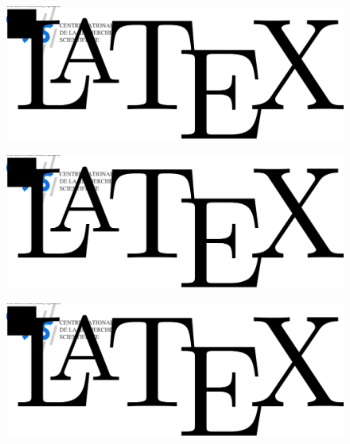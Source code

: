 \documentclass[10pt,a4paper]{article}
\begin{document}
\begin{figure}
\includegraphics[subfig=2,scale=0.5]{fig/logo.svg}
\end{figure}
\begin{figure}
\includegraphics[subfig=1,scale=0.5]{fig/logo.svg}
\end{figure}
\begin{figure}
\includegraphics[subfig=3,width=\linewidth]{fig/logo.svg}
\end{figure}
\end{document}

